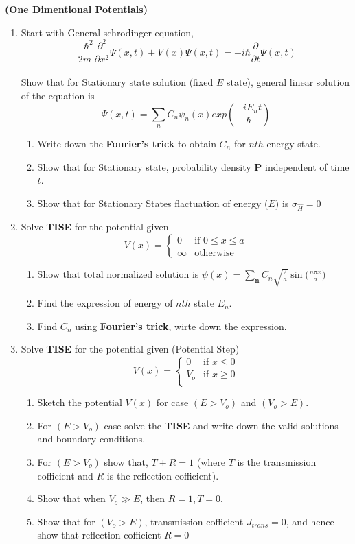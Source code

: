 \documentclass{article}[12pt, a4paper]
\begin{document}
\textbf{(One Dimentional Potentials)}
\begin{enumerate}

\item Start with General schrodinger equation,
$$\frac{-\hbar^2}{2m}\frac{\partial^2}{\partial x^2} \Psi(x, t) + V(x) \Psi(x, t)= -i \hbar \frac{\partial}{\partial t} \Psi(x, t)$$ \\
Show that for Stationary state solution (fixed $E$ state), general linear solution of the equation is
$$\Psi(x, t) = \sum_n C_n \psi_n(x)exp({\frac{-i E_n t}{\hbar}})$$
\begin{enumerate}
    \item Write down the \textbf{Fourier's trick} to obtain $C_n$ for $nth$ energy state.
    \item Show that for Stationary state, probability density $\mathbf{P}$ independent of time $t$.
	\item Show that for Stationary States flactuation of energy ($E$) is $\sigma_{\hat{H}} = 0$
\end{enumerate}

\item Solve \textbf{TISE} for the potential given
$$
V(x) =
\begin{cases}
0 & \text{if } 0 \le x \le a \\
\infty & \text{otherwise}
\end{cases}$$
\begin{enumerate}
 \item Show that total normalized solution is $\psi(x) = \displaystyle\mathbf{\sum_n} C_n \sqrt{\frac{2}{a}} \sin \displaystyle(\frac{\displaystyle n\pi x}{\displaystyle a}\displaystyle)$
 \item Find the expression of energy of $nth$ state $E_n$.
 \item Find $C_n$ using \textbf{Fourier's trick}, wirte down the expression.
\end{enumerate}

\item Solve \textbf{TISE} for the potential given (Potential Step)
$$
V(x) =
\begin{cases}
0 & \text{if }  x \le 0 \\
V_o & \text{if } x \ge 0 \\
\end{cases}$$
\begin{enumerate}
    \item Sketch the potential $V(x)$ for case $(E > V_o)$ and $(V_o > E)$.
	\item For $(E > V_o)$ case solve the \textbf{TISE} and write down the valid solutions and boundary conditions.
	\item For $(E > V_o)$ show that, $T + R = 1$ (where $T$ is the transmission cofficient and $R$ is the reflection cofficient).
	\item Show that when $V_o \gg E$, then $R = 1, T = 0$.
	\item Show that for $(V_o > E)$, transmission cofficient $J_{trans} = 0$, and hence show that
	reflection cofficient $R = 0$
\end{enumerate}


\end{enumerate}
\end{document}
